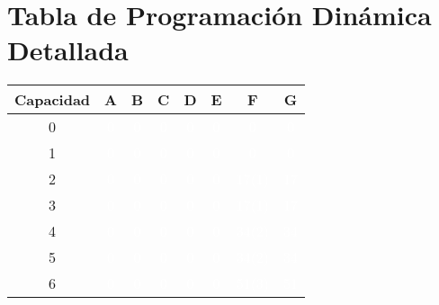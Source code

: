 \documentclass{article}
\begin{document}
\section*{Tabla de Programación Dinámica Detallada}
\begin{center}
\scriptsize
\begin{tabular}{|c|c|c|c|c|c|c|c|}
\hline
Capacidad & A & B & C & D & E & F & G \\ \hline
0 & \cellcolor{rojo}\textcolor{white}{0} & \cellcolor{rojo}\textcolor{white}{0} & \cellcolor{rojo}\textcolor{white}{0} & \cellcolor{rojo}\textcolor{white}{0} & \cellcolor{rojo}\textcolor{white}{0} & \cellcolor{rojo}\textcolor{white}{0} & \cellcolor{rojo}\textcolor{white}{0} \\ \hline
1 & \cellcolor{rojo}\textcolor{white}{0} & \cellcolor{rojo}\textcolor{white}{0} & \cellcolor{rojo}\textcolor{white}{0} & \cellcolor{rojo}\textcolor{white}{0} & \cellcolor{rojo}\textcolor{white}{0} & \cellcolor{rojo}\textcolor{white}{0} & \cellcolor{rojo}\textcolor{white}{0} \\ \hline
2 & \cellcolor{rojo}\textcolor{white}{0} & \cellcolor{rojo}\textcolor{white}{0} & \cellcolor{rojo}\textcolor{white}{0} & \cellcolor{rojo}\textcolor{white}{0} & \cellcolor{rojo}\textcolor{white}{0} & \cellcolor{verde}\textcolor{white}{17(1)} & \cellcolor{rojo}\textcolor{white}{17} \\ \hline
3 & \cellcolor{rojo}\textcolor{white}{0} & \cellcolor{rojo}\textcolor{white}{0} & \cellcolor{rojo}\textcolor{white}{0} & \cellcolor{rojo}\textcolor{white}{0} & \cellcolor{rojo}\textcolor{white}{0} & \cellcolor{verde}\textcolor{white}{17(1)} & \cellcolor{rojo}\textcolor{white}{17} \\ \hline
4 & \cellcolor{rojo}\textcolor{white}{0} & \cellcolor{rojo}\textcolor{white}{0} & \cellcolor{rojo}\textcolor{white}{0} & \cellcolor{rojo}\textcolor{white}{0} & \cellcolor{rojo}\textcolor{white}{0} & \cellcolor{verde}\textcolor{white}{34(2)} & \cellcolor{rojo}\textcolor{white}{34} \\ \hline
5 & \cellcolor{rojo}\textcolor{white}{0} & \cellcolor{rojo}\textcolor{white}{0} & \cellcolor{rojo}\textcolor{white}{0} & \cellcolor{rojo}\textcolor{white}{0} & \cellcolor{rojo}\textcolor{white}{0} & \cellcolor{verde}\textcolor{white}{34(2)} & \cellcolor{rojo}\textcolor{white}{34} \\ \hline
6 & \cellcolor{rojo}\textcolor{white}{0} & \cellcolor{rojo}\textcolor{white}{0} & \cellcolor{rojo}\textcolor{white}{0} & \cellcolor{rojo}\textcolor{white}{0} & \cellcolor{rojo}\textcolor{white}{0} & \cellcolor{verde}\textcolor{white}{51(3)} & \cellcolor{rojo}\textcolor{white}{51} \\ \hline

\end{tabular}
\end{center}
\end{document}

